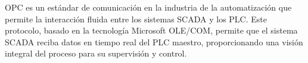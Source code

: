 \begin{itemize}
            OPC es un estándar de comunicación en la industria de la automatización que permite la interacción
            fluida entre los sistemas SCADA y los PLC. Este protocolo, basado en la tecnología Microsoft OLE/COM,
            permite que el sistema SCADA reciba datos en tiempo real del PLC maestro, proporcionando una visión
            integral del proceso para su supervisión y control.


\end{itemize}
